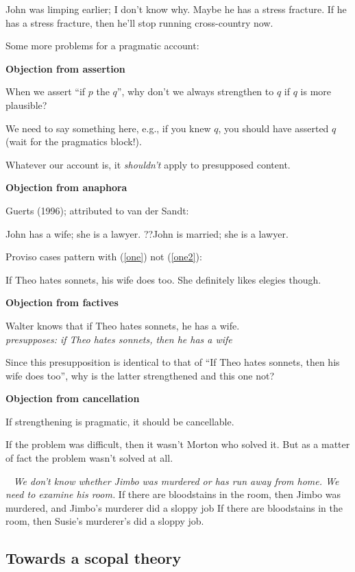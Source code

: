 \documentclass[nols,twoside,nofonts,nobib,nohyper]{tufte-handout}
\begin{document}
\ex
John was limping earlier; I don't know why. Maybe he has a stress fracture. If he has a stress fracture, then he'll stop running cross-country now.
\xe

Some more problems for a pragmatic account:

\textbf{Objection from assertion}

When we assert \enquote{if \(p\) the \(q\)}, why don't we always strengthen to \(q\) if \(q\) is more plausible?

We need to say something here, e.g., if you knew \(q\), you should have asserted \(q\) (wait for the pragmatics block!).

Whatever our account is, it \textit{shouldn't} apply to presupposed content.

\textbf{Objection from anaphora}

Guerts (1996); attributed to van der Sandt:

\pex
\a\label{one}John has a wife; she is a lawyer.
\a\label{one2}??John is married; she is a lawyer.
\xe

Proviso cases pattern with (\ref{one}) not (\ref{one2}):

\ex
If Theo hates sonnets, his wife does too. She definitely likes elegies though.
\xe

\textbf{Objection from factives}

\ex
Walter knows that if Theo hates sonnets, he has a wife.\\
\phantom{,}\hfill\textit{presupposes: if Theo hates sonnets, then he has a wife}
\xe

Since this presupposition is identical to that of \enquote{If Theo hates sonnets, then his wife does too}, why is the latter strengthened and this one not?

\textbf{Objection from cancellation}

If strengthening is pragmatic, it should be cancellable.

\ex
If the problem was difficult, then it wasn't Morton who solved it. But as a matter of fact the problem wasn't solved at all.
\xe

\pex~
\textit{We don't know whether Jimbo was murdered or has run away from home. We need to examine his room.}
\a If there are bloodstains in the room, then Jimbo was murdered, and Jimbo's murderer did a sloppy job
\a\ljudge{\#}If there are bloodstains in the room, then Susie's murderer's did a sloppy job.
\xe

\subsection{Towards a scopal theory}
\end{document}
